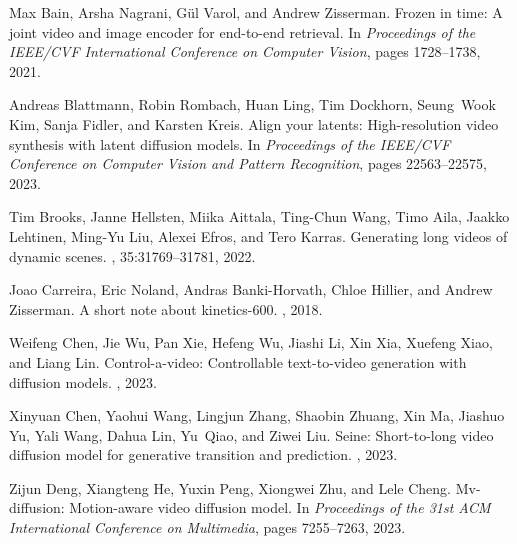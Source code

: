 \documentclass{article}
\begin{document}
% 
% 
\begin{thebibliography}{}

Max Bain, Arsha Nagrani, G{\"u}l Varol, and Andrew Zisserman.
\newblock Frozen in time: A joint video and image encoder for end-to-end retrieval.
\newblock In {\em Proceedings of the IEEE/CVF International Conference on Computer Vision}, pages 1728--1738, 2021.

Andreas Blattmann, Robin Rombach, Huan Ling, Tim Dockhorn, Seung~Wook Kim, Sanja Fidler, and Karsten Kreis.
\newblock Align your latents: High-resolution video synthesis with latent diffusion models.
\newblock In {\em Proceedings of the IEEE/CVF Conference on Computer Vision and Pattern Recognition}, pages 22563--22575, 2023.

Tim Brooks, Janne Hellsten, Miika Aittala, Ting-Chun Wang, Timo Aila, Jaakko Lehtinen, Ming-Yu Liu, Alexei Efros, and Tero Karras.
\newblock Generating long videos of dynamic scenes.
, 35:31769--31781, 2022.

Joao Carreira, Eric Noland, Andras Banki-Horvath, Chloe Hillier, and Andrew Zisserman.
\newblock A short note about kinetics-600.
, 2018.

Weifeng Chen, Jie Wu, Pan Xie, Hefeng Wu, Jiashi Li, Xin Xia, Xuefeng Xiao, and Liang Lin.
\newblock Control-a-video: Controllable text-to-video generation with diffusion models.
, 2023.

Xinyuan Chen, Yaohui Wang, Lingjun Zhang, Shaobin Zhuang, Xin Ma, Jiashuo Yu, Yali Wang, Dahua Lin, Yu~Qiao, and Ziwei Liu.
\newblock Seine: Short-to-long video diffusion model for generative transition and prediction.
, 2023.

Zijun Deng, Xiangteng He, Yuxin Peng, Xiongwei Zhu, and Lele Cheng.
\newblock Mv-diffusion: Motion-aware video diffusion model.
\newblock In {\em Proceedings of the 31st ACM International Conference on Multimedia}, pages 7255--7263, 2023.


\end{thebibliography}
\end{document}
